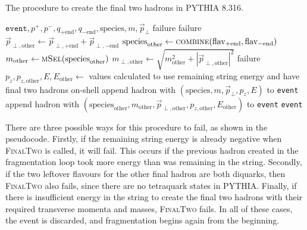 \documentclass[12pt,a4paper]{report}
\begin{document}
\begin{algorithm}
  \caption{The procedure to create the final two hadrons in PYTHIA 8.316.}\label{alg:finaltwo}
  \begin{algorithmic}
     {$\texttt{event}, p^+, p^-, q_{+\text{end}},q_{-\text{end}}, \text{species}, m, \vec{p}_\perp$}
        \State \Return failure 
      \EndIf
        \State \Return failure 
      \EndIf
      \State $\vec{p}_{\perp,\text{other}} \gets \vec{p}_{\perp,+\text{end}} + \vec{p}_{\perp,-\text{end}}$
      \Repeat
        \State $\text{species}_\text{other} \gets \textsc{combine}(\text{flav}_{+\text{end}}, \text{flav}_{-\text{end}})$
        \State $m_\text{other} \gets \textsc{mSel}(\text{species}_\text{other})$
      \State $m_{\perp,\text{other}} \gets \sqrt{m_\text{other}^2 + |\vec{p}_{\perp,\text{other}}|^2}$
        \State \Return failure 
      \EndIf
      \State $p_z, p_{z,\text{other}}, E, E_\text{other} \gets$ values calculated to use remaining string energy and have final two hadrons on-shell
      \State append hadron with $(\text{species}, m, \vec{p}_\perp, p_z, E)$ to \texttt{event}
      \State append hadron with $(\text{species}_\text{other}, m_\text{other}, \vec{p}_{\perp,\text{other}}, p_{z,\text{other}}, E_\text{other})$ to \texttt{event}
      \State \Return \texttt{event}
    \EndProcedure
  \end{algorithmic}
\end{algorithm}

There are three possible ways for this procedure to fail, as shown in the pseudocode. Firstly, if the remaining string energy is already negative when \textsc{FinalTwo} is called, it will fail. This occurs if the previous hadron created in the fragmentation loop took more energy than was remaining in the string. Secondly, if the two leftover flavours for the other final hadron are both diquarks, then \textsc{FinalTwo} also fails, since there are no tetraquark states in PYTHIA. Finally, if there is insufficient energy in the string to create the final two hadrons with their required transverse momenta and masses, \textsc{FinalTwo} fails. In all of these cases, the event is discarded, and fragmentation begins again from the beginning.
\end{document}

